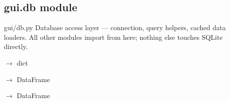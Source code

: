 \documentclass[letterpaper,10pt,english]{sphinxmanual}
\begin{document}
\sphinxstepscope


\subsection{gui.db module}
\label{\detokenize{gui.db:module-gui.db}}\label{\detokenize{gui.db:gui-db-module}}\label{\detokenize{gui.db::doc}}
\sphinxAtStartPar
gui/db.py
Database access layer — connection, query helpers, cached data loaders.
All other modules import from here; nothing else touches SQLite directly.

\begin{fulllineitems}
\label{\detokenize{gui.db:gui.db.db}}
\pysigstartsignatures
\pysiglinewithargsret
{}
{}
{}
\pysigstopsignatures
\end{fulllineitems}


\begin{fulllineitems}
\label{\detokenize{gui.db:gui.db.load_overview}}
\pysigstartsignatures
\pysiglinewithargsret
{}
{}
{{ $\rightarrow$ dict}}
\pysigstopsignatures
\end{fulllineitems}


\begin{fulllineitems}
\label{\detokenize{gui.db:gui.db.load_runs}}
\pysigstartsignatures
\pysiglinewithargsret
{}
{}
{{ $\rightarrow$ DataFrame}}
\pysigstopsignatures
\end{fulllineitems}


\begin{fulllineitems}
\label{\detokenize{gui.db:gui.db.load_tax}}
\pysigstartsignatures
\pysiglinewithargsret
{}
{}
{{ $\rightarrow$ DataFrame}}
\pysigstopsignatures
\end{fulllineitems}
\end{document}
